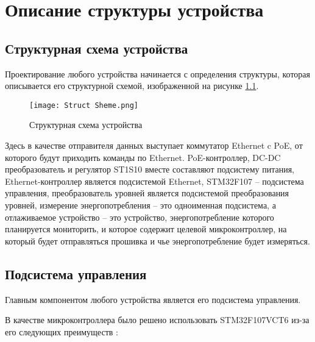 
\chapter{Описание структуры устройства}

\section{Структурная схема устройства}
\hspace{1cm}

Проектирование любого устройства начинается с определения структуры, которая описывается
его структурной схемой, изображенной
на рисунке \ref{ris:261}.

\begin{figure}[H]
  \centering
  \texttt{[image: Struct Sheme.png]}
  \caption{Структурная схема устройства}
  \label{ris:261}
\end{figure}

Здесь в качестве отправителя данных выступает коммутатор Ethernet c PoE, от которого будут приходить
команды по Ethernet. PoE-контроллер, DC-DC преобразователь и регулятор ST1S10 вместе составляют 
подсистему питания,
Ethernet-контроллер является подсистемой Ethernet, STM32F107 -- подсистема управления, 
преобразователь уровней является подсистемой преобразования уровней, измерение энергопотребления --
это одноименная подсистема, а отлаживаемое устройство -- это устройство, энергопотребление которого
планируется мониторить, и которое содержит целевой микроконтроллер,
на который будет отправляться прошивка и чье энергопотребление будет измеряться.

\section{Подсистема управления}
\hspace{1cm} 

Главным компонентом любого устройства является его подсистема управления.

В качестве микроконтроллера было решено использовать
STM32F107VCT6 из-за его следующих преимуществ \cite{STM32:datasheet}:

